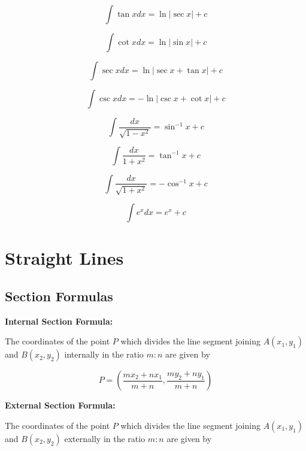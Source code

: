 \documentclass{article}
\begin{document}
\begin{equation}
\int \tan x dx = \ln |\sec x| + c
\end{equation}

\begin{equation}
\int \cot x dx = \ln |\sin x| + c
\end{equation}

\begin{equation}
\int \sec x dx = \ln |\sec x + \tan x| + c
\end{equation}

\begin{equation}
\int \csc x dx = -\ln |\csc x + \cot x| + c
\end{equation}

\begin{equation}
\int \frac{dx}{\sqrt{1-x^2}} = \sin^{-1} x + c
\end{equation}

\begin{equation}
\int \frac{dx}{1+x^2} = \tan^{-1} x + c
\end{equation}

\begin{equation}
\int \frac{dx}{\sqrt{1+x^2}} = -\cos^{-1} x + c
\end{equation}

\begin{equation}
\int e^x dx = e^x + c
\end{equation}

\section{Straight Lines}

\subsection{Section Formulas}

\textbf{Internal Section Formula:}

The coordinates of the point \(P\) which divides the line segment joining \(A(x_1, y_1)\) and \(B(x_2, y_2)\) internally in the ratio \(m:n\) are given by

\begin{equation}
P = \left(\frac{m x_2 + n x_1}{m + n}, \frac{m y_2 + n y_1}{m + n}\right)
\end{equation}

\textbf{External Section Formula:}

The coordinates of the point \(P\) which divides the line segment joining \(A(x_1, y_1)\) and \(B(x_2, y_2)\) externally in the ratio \(m:n\) are given by
\end{document}
